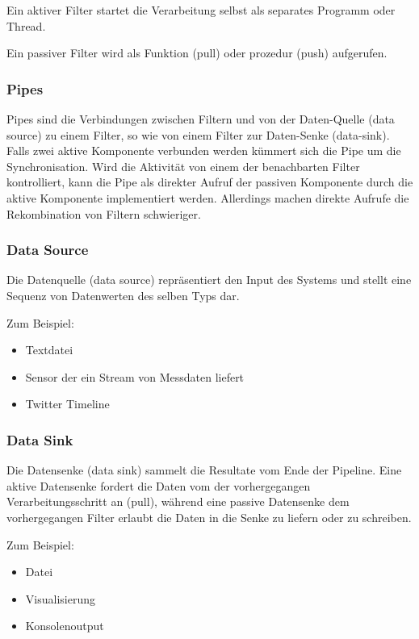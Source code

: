 Ein aktiver Filter startet die Verarbeitung selbst als separates Programm oder Thread.

Ein passiver Filter wird als Funktion (pull) oder prozedur (push) aufgerufen.

\subsubsection*{Pipes}


Pipes sind die Verbindungen zwischen Filtern und von der Daten-Quelle (data source) zu einem Filter, so wie von einem Filter zur Daten-Senke (data-sink). Falls zwei aktive Komponente verbunden werden kümmert sich die Pipe um die Synchronisation. Wird die Aktivität von einem der benachbarten Filter kontrolliert, kann die Pipe als direkter Aufruf der passiven Komponente durch die aktive Komponente implementiert werden. Allerdings machen direkte Aufrufe die Rekombination von Filtern schwieriger.

\subsubsection*{Data Source}


Die Datenquelle (data source) repräsentiert den Input des Systems und stellt eine Sequenz von Datenwerten des selben Typs dar.

Zum Beispiel:
\begin{itemize}
	\item Textdatei
	\item Sensor der ein Stream von Messdaten liefert
	\item Twitter Timeline
\end{itemize}

\subsubsection*{Data Sink}


Die Datensenke (data sink) sammelt die Resultate vom Ende der Pipeline. Eine aktive Datensenke fordert die Daten vom der vorhergegangen Verarbeitungsschritt an (pull), während eine passive Datensenke dem vorhergegangen Filter erlaubt die Daten in die Senke zu liefern oder zu schreiben.

Zum Beispiel:
\begin{itemize}
	\item Datei
	\item Visualisierung
	\item Konsolenoutput
\end{itemize}

